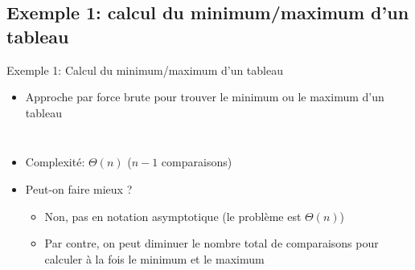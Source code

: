 \subsection{Exemple 1: calcul du minimum/maximum d'un tableau}

\begin{frame}{Exemple 1: Calcul du minimum/maximum d'un tableau}

\begin{itemize}
\item Approche par force brute pour trouver le minimum ou le maximum d'un tableau
\end{itemize}

\begin{columns}
\begin{column}{5cm}
\begin{center}
{\small
{}
}
\end{center}
\end{column}
\begin{column}{5cm}
\begin{center}
{\small
{}
}
\end{center}
\end{column}
\end{columns}

\bigskip

\begin{itemize}
\item Complexité: $\Theta(n)$ ($n-1$ comparaisons)
\item Peut-on faire mieux ?
\begin{itemize}
\item Non, pas en notation asymptotique (le problème est $\Theta(n)$)
\item Par contre, on peut diminuer le nombre total de comparaisons pour calculer à la fois le minimum et le maximum
\end{itemize}
\end{itemize}

\end{frame}

